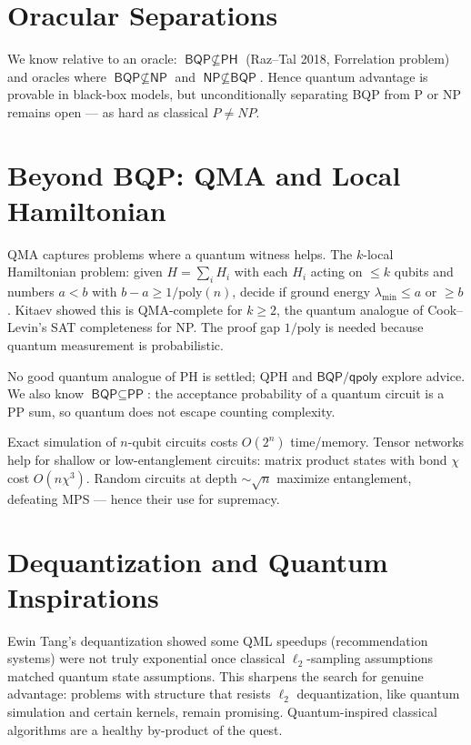 \section{Oracular Separations}
We know relative to an oracle: $\textsf{BQP}\not\subseteq\textsf{PH}$ (Raz--Tal 2018, Forrelation problem) and oracles where $\textsf{BQP}\not\subseteq\textsf{NP}$ and $\textsf{NP}\not\subseteq\textsf{BQP}$. Hence quantum advantage is provable in black-box models, but unconditionally separating BQP from P or NP remains open --- as hard as classical $P\neq NP$.


\section{Beyond BQP: QMA and Local Hamiltonian}
QMA captures problems where a quantum witness helps. The $k$-local Hamiltonian problem: given $H=\sum_i H_i$ with each $H_i$ acting on $\le k$ qubits and numbers $a<b$ with $b-a\ge1/\mathrm{poly}(n)$, decide if ground energy $\lambda_{\min}\le a$ or $\ge b$. Kitaev showed this is QMA-complete for $k\ge2$, the quantum analogue of Cook--Levin's SAT completeness for NP. The proof gap $1/\mathrm{poly}$ is needed because quantum measurement is probabilistic.

No good quantum analogue of PH is settled; QPH and $\textsf{BQP/qpoly}$ explore advice. We also know $\textsf{BQP}\subseteq\textsf{PP}$: the acceptance probability of a quantum circuit is a \textsf{PP} sum, so quantum does not escape counting complexity.

\begin{example}
Exact simulation of $n$-qubit circuits costs $O(2^n)$ time/memory. Tensor networks help for shallow or low-entanglement circuits: matrix product states with bond $\chi$ cost $O(n\chi^3)$. Random circuits at depth $\sim\sqrt n$ maximize entanglement, defeating MPS --- hence their use for supremacy.
\end{example}

\section{Dequantization and Quantum Inspirations}
Ewin Tang's dequantization showed some QML speedups (recommendation systems) were not truly exponential once classical $\ell_2$-sampling assumptions matched quantum state assumptions. This sharpens the search for genuine advantage: problems with structure that resists $\ell_2$ dequantization, like quantum simulation and certain kernels, remain promising. Quantum-inspired classical algorithms are a healthy by-product of the quest.


